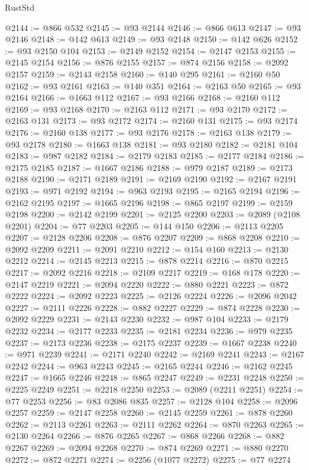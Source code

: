 \begin{lexlean}{RustStd}
\begin{coremodule}
@2144 := @866 @532
@2145 := @93 @2144
@2146 := @866 @613
@2147 := @93 @2146
@2148 := @142 @613
@2149 := @93 @2148
@2150 := @142 @626
@2152 := @93 @2150 @104
@2153 := @2149 @2152
@2154 := @2147 @2153
@2155 := @2145 @2154
@2156 := @876 @2155
@2157 := @874 @2156
@2158 := @2092 @2157
@2159 := @2143 @2158
@2160 := @140 @295
@2161 := @2160 @50
@2162 := @93 @2161
@2163 := @140 @351
@2164 := @2163 @50
@2165 := @93 @2164
@2166 := @1663 @112
@2167 := @93 @2166
@2168 := @2160 @112
@2169 := @93 @2168
@2170 := @2163 @112
@2171 := @93 @2170
@2172 := @2163 @131
@2173 := @93 @2172
@2174 := @2160 @131
@2175 := @93 @2174
@2176 := @2160 @138
@2177 := @93 @2176
@2178 := @2163 @138
@2179 := @93 @2178
@2180 := @1663 @138
@2181 := @93 @2180
@2182 := @2181 @104
@2183 := @987 @2182
@2184 := @2179 @2183
@2185 := @2177 @2184
@2186 := @2175 @2185
@2187 := @1667 @2186
@2188 := @979 @2187
@2189 := @2173 @2188
@2190 := @2171 @2189
@2191 := @2169 @2190
@2192 := @2167 @2191
@2193 := @971 @2192
@2194 := @963 @2193
@2195 := @2165 @2194
@2196 := @2162 @2195
@2197 := @1665 @2196
@2198 := @865 @2197
@2199 := @2159 @2198
@2200 := @2142 @2199
@2201 := @2125 @2200
@2203 := @2089 (@2108 @2201)
@2204 := @77 @2203
@2205 := @144 @150
@2206 := @2113 @2205
@2207 := @2128 @2206
@2208 := @876 @2207
@2209 := @868 @2208
@2210 := @2092 @2209
@2211 := @2091 @2210
@2212 := @154 @160
@2213 := @2130 @2212
@2214 := @2145 @2213
@2215 := @878 @2214
@2216 := @870 @2215
@2217 := @2092 @2216
@2218 := @2109 @2217
@2219 := @168 @178
@2220 := @2147 @2219
@2221 := @2094 @2220
@2222 := @880 @2221
@2223 := @872 @2222
@2224 := @2092 @2223
@2225 := @2126 @2224
@2226 := @2096 @2042
@2227 := @2111 @2226
@2228 := @882 @2227
@2229 := @874 @2228
@2230 := @2092 @2229
@2231 := @2143 @2230
@2232 := @987 @104
@2233 := @2179 @2232
@2234 := @2177 @2233
@2235 := @2181 @2234
@2236 := @979 @2235
@2237 := @2173 @2236
@2238 := @2175 @2237
@2239 := @1667 @2238
@2240 := @971 @2239
@2241 := @2171 @2240
@2242 := @2169 @2241
@2243 := @2167 @2242
@2244 := @963 @2243
@2245 := @2165 @2244
@2246 := @2162 @2245
@2247 := @1665 @2246
@2248 := @865 @2247
@2249 := @2231 @2248
@2250 := @2225 @2249
@2251 := @2218 @2250
@2253 := @2089 (@2211 @2251)
@2254 := @77 @2253
@2256 := @83 @2086 @835
@2257 := @2128 @104
@2258 := @2096 @2257
@2259 := @2147 @2258
@2260 := @2145 @2259
@2261 := @878 @2260
@2262 := @2113 @2261
@2263 := @2111 @2262
@2264 := @870 @2263
@2265 := @2130 @2264
@2266 := @876 @2265
@2267 := @868 @2266
@2268 := @882 @2267
@2269 := @2094 @2268
@2270 := @874 @2269
@2271 := @880 @2270
@2272 := @872 @2271
@2274 := @2256 (@1077 @2272)
@2275 := @77 @2274

\end{coremodule}
\end{lexlean}
